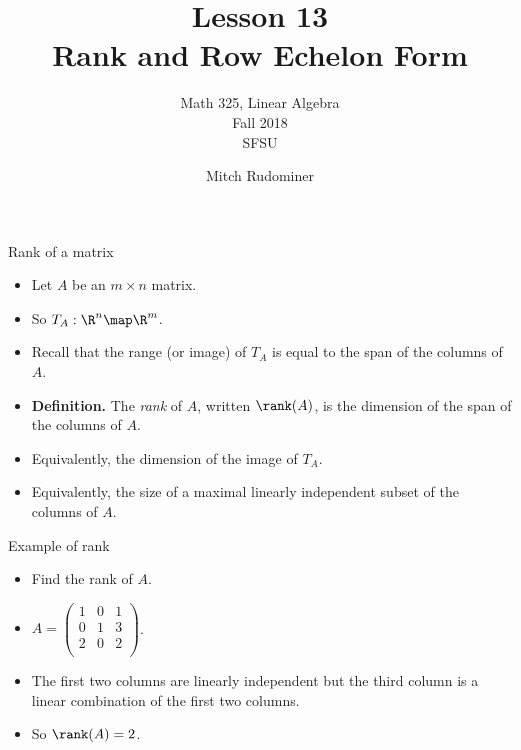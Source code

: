 \documentclass{beamer}
\title{Lesson 13 \\ Rank and Row Echelon Form}
\subtitle{Math 325, Linear Algebra \\ Fall 2018 \\ SFSU}
\author{Mitch Rudominer}
\date{}
\begin{document}
\begin{frame}
  \titlepage
\end{frame}


\begin{frame}{Rank of a matrix}

\begin{itemize}
\item Let $A$ be an $m\times n$ matrix.
\item So $T_A:\R^n\map\R^m$.
\item Recall that the range (or image) of $T_A$ is equal to the span of the
columns of $A$.
\item \textbf{Definition.} The \emph{rank} of $A$, written $\rank(A)$,
is the dimension of the span of the columns of $A$.\
\item Equivalently, the dimension of the image of $T_A$.
\item Equivalently, the size of a maximal linearly independent subset of
the columns of $A$.
\end{itemize}
\end{frame}

\begin{frame}{Example of rank}

\begin{itemize}
\item Find the rank of $A$.
\item $A=
\begin{pmatrix}
1  & 0  & 1 \\
0  & 1  & 3 \\
2  & 0  & 2 \\
\end{pmatrix}
$.
\item The first two columns are linearly independent but the third column
is a linear combination of the first two columns.
\item So $\rank(A) = 2$.
\end{itemize}


\end{frame}

\end{document}
